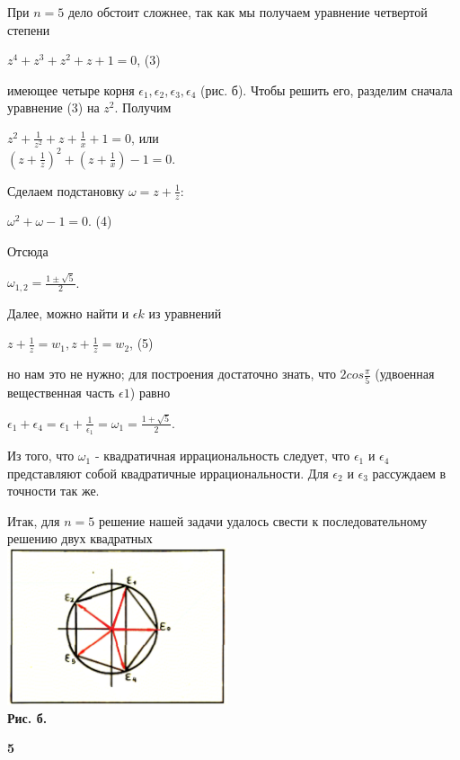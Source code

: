\begin{adjustwidth}{8.5cm}{0cm}
    При  $n=5$ дело обстоит сложнее, так как мы получаем уравнение четвертой степени
    \begin{center}
        $z^{4}+z^{3}+z^{2}+z+1=0$, \quad(3)
    \end{center}
    имеющее четыре корня $\epsilon_{1}, \epsilon_{2}, \epsilon_{3}, \epsilon_{4} $ (рис. б). Чтобы решить его, разделим сначала уравнение (3) на $z^{2}$. Получим
    \begin{center}
        $ z^{2}+\frac{1}{z^{2}}+z+\frac{1}{x}+1=0 $, или \\[1em]$ (z+\frac{1}{z})^{2}+(z+\frac{1}{x})-1=0 $.
    \end{center}
    \vspace{1em}
    \noindent
    Сделаем подстановку $ \omega=z+\frac{1}{z} $:
    \begin{center}
        $ \omega^{2}+\omega-1=0 $.  \quad(4)
    \end{center}
    \noindent
    Отсюда
    \begin{center}
        $ \omega_{1,2}=\frac{1\pm\sqrt{5}}{2} $.
    \end{center}
    \vspace{1em}
    
    Далее, можно найти и $\epsilon{k}$ из уравнений
    \begin{center}
       $ z+\frac{1}{z}=w_{1}, z+\frac{1}{z}=w_{2} $, (5) 
    \end{center}
    \vspace{1em}
    \noindent
    но нам это не нужно; для построения достаточно знать, что $2cos\frac{\pi}{5}$ (удвоенная вещественная часть $\epsilon{1}$) равно
    \begin{center}
        $\epsilon_{1}+\epsilon_{4}=\epsilon_{1}+\frac{1}{\epsilon_{1}}=\omega_{1}=\frac{1+\sqrt{5}}{2}$.
    \end{center}
    \vspace{1em}
    
    Из того, что $\omega_{1}$ - квадратичная иррациональность следует, что $\epsilon_{1}$ и $\epsilon_{4}$ представляют собой квадратичные иррациональности. Для $\epsilon_{2}$ и $\epsilon_{3}$ рассуждаем в точности так же.\par
    
    Итак, для $ n=5 $ решение нашей задачи удалось свести к последовательному решению двух квадратных\\[1em]
    \includegraphics[width=6.5cm]{Untitled1.png}\\
    \scriptsize\textbf{Рис. б.}
    \begin{flushright}
        \small\textbf{5}
    \end{flushright}
\end{adjustwidth}

    


    

